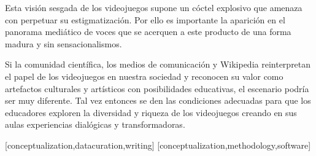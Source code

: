 \documentclass[spanish]{textolivre}
\begin{document}
Esta visión sesgada de los videojuegos supone un cóctel explosivo que amenaza con perpetuar su estigmatización. Por ello es importante la aparición en el panorama mediático de voces que se acerquen a este producto de una forma madura y sin sensacionalismos.

Si la comunidad científica, los medios de comunicación y Wikipedia reinterpretan el papel de los videojuegos en nuestra sociedad y reconocen su valor como artefactos culturales y artísticos con posibilidades educativas, el escenario podría ser muy diferente. Tal vez entonces se den las condiciones adecuadas para que los educadores exploren la diversidad y riqueza de los videojuegos creando en sus aulas experiencias dialógicas y transformadoras.












 














\printbibliography\label{sec-bib}


\begin{contributors}
[conceptualization,datacuration,writing]
[conceptualization,methodology,software]
\end{contributors}
\end{document}
